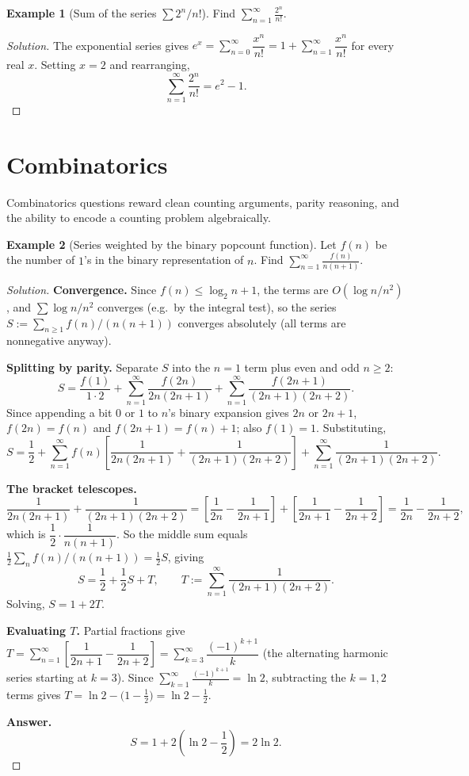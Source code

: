 \documentclass[11pt]{article}
\theoremstyle{definition}
\newtheorem{example}{Example}[section]
\begin{document}
\begin{example}[Sum of the series $\sum 2^n/n!$]
Find $\displaystyle\sum_{n=1}^\infty\frac{2^n}{n!}$.
\end{example}
\begin{proof}[Solution]
The exponential series gives $e^x=\sum_{n=0}^\infty\dfrac{x^n}{n!}=1+\sum_{n=1}^\infty\dfrac{x^n}{n!}$ for every real $x$. Setting $x=2$ and rearranging,
\[
\boxed{\sum_{n=1}^\infty\frac{2^n}{n!}=e^2-1}.
\]
\end{proof}

\section{Combinatorics}
Combinatorics questions reward clean counting arguments, parity reasoning, and the ability to encode a counting problem algebraically.

\begin{example}[Series weighted by the binary popcount function]
Let $f(n)$ be the number of $1$'s in the binary representation of $n$. Find $\displaystyle\sum_{n=1}^\infty\frac{f(n)}{n(n+1)}$.
\end{example}
\begin{proof}[Solution]
\textbf{Convergence.} Since $f(n)\le\log_2n+1$, the terms are $O(\log n/n^2)$, and $\sum\log n/n^2$ converges (e.g.\ by the integral test), so the series $S:=\sum_{n\ge1}f(n)/(n(n+1))$ converges absolutely (all terms are nonnegative anyway).

\textbf{Splitting by parity.} Separate $S$ into the $n=1$ term plus even and odd $n\ge2$:
\[
S=\frac{f(1)}{1\cdot2}+\sum_{n=1}^\infty\frac{f(2n)}{2n(2n+1)}+\sum_{n=1}^\infty\frac{f(2n+1)}{(2n+1)(2n+2)}.
\]
Since appending a bit $0$ or $1$ to $n$'s binary expansion gives $2n$ or $2n+1$, $f(2n)=f(n)$ and $f(2n+1)=f(n)+1$; also $f(1)=1$. Substituting,
\[
S=\frac12+\sum_{n=1}^\infty f(n)\left[\frac1{2n(2n+1)}+\frac1{(2n+1)(2n+2)}\right]+\sum_{n=1}^\infty\frac1{(2n+1)(2n+2)}.
\]

\textbf{The bracket telescopes.}
\[
\frac1{2n(2n+1)}+\frac1{(2n+1)(2n+2)}=\left[\frac1{2n}-\frac1{2n+1}\right]+\left[\frac1{2n+1}-\frac1{2n+2}\right]=\frac1{2n}-\frac1{2n+2},
\]
which is $\dfrac12\cdot\dfrac1{n(n+1)}$. So the middle sum equals $\tfrac12\sum_n f(n)/(n(n+1))=\tfrac12S$, giving
\[
S=\frac12+\frac12S+T,\qquad T:=\sum_{n=1}^\infty\frac1{(2n+1)(2n+2)}.
\]
Solving, $S=1+2T$.

\textbf{Evaluating $T$.} Partial fractions give $T=\sum_{n=1}^\infty\left[\dfrac1{2n+1}-\dfrac1{2n+2}\right]=\sum_{k=3}^\infty\dfrac{(-1)^{k+1}}{k}$ (the alternating harmonic series starting at $k=3$). Since $\sum_{k=1}^\infty\frac{(-1)^{k+1}}k=\ln2$, subtracting the $k=1,2$ terms gives $T=\ln2-\bigl(1-\tfrac12\bigr)=\ln2-\tfrac12$.

\textbf{Answer.}
\[
S=1+2\left(\ln2-\frac12\right)=\boxed{2\ln2}.
\]
\end{proof}
\end{document}
